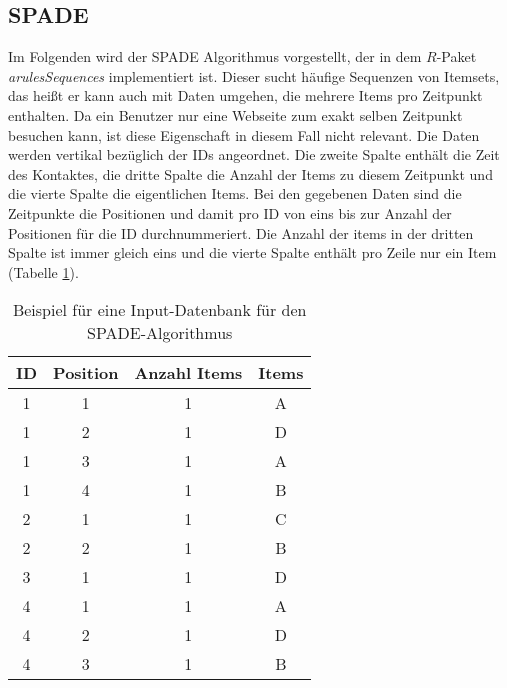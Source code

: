 \subsection{SPADE}
Im Folgenden wird der SPADE Algorithmus \cite{spade} vorgestellt, der in dem $R$-Paket \textit{arulesSequences} \cite{arulesSequences} implementiert ist. Dieser sucht häufige Sequenzen von Itemsets, das heißt er kann auch mit Daten umgehen, die mehrere Items pro Zeitpunkt enthalten. Da ein Benutzer nur eine Webseite zum exakt selben Zeitpunkt besuchen kann, ist diese Eigenschaft in diesem Fall nicht relevant. Die Daten werden vertikal bezüglich der IDs angeordnet. Die zweite Spalte enthält die Zeit des Kontaktes, die dritte Spalte die Anzahl der Items zu diesem Zeitpunkt und die vierte Spalte die eigentlichen Items. Bei den gegebenen Daten sind die Zeitpunkte die Positionen und damit pro ID von eins bis zur Anzahl der Positionen für die ID durchnummeriert. Die Anzahl der items in der dritten Spalte ist immer gleich eins und die vierte Spalte enthält pro Zeile nur ein Item (Tabelle \ref{input}).\\
\begin{table}[hbt]
\centering
\begin{tabular}{c|c|c|c}
ID & Position  & Anzahl Items & Items \\ \hline
1  & 1				 & 1						& A \\
1  & 2				 & 1						& D \\
1  & 3				 & 1						& A \\
1  & 4				 & 1						& B \\
2  & 1				 & 1						& C \\
2  & 2				 & 1						& B \\
3  & 1				 & 1						& D \\
4  & 1				 & 1						& A \\
4  & 2				 & 1						& D \\
4  & 3				 & 1						& B \\
\end{tabular}
\caption{Beispiel für eine Input-Datenbank für den SPADE-Algorithmus}\label{input}
\end{table}

